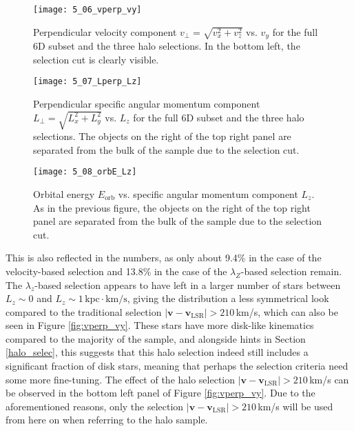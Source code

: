\documentclass[a4paper,11pt]{article}
\begin{document}
\begin{figure}[H]
 \begin{minipage}[t]{\textwidth}
  \centering
  \texttt{[image: 5\_06\_vperp\_vy]}
  \caption[$v_\perp$ vs. $v_y$ for 6D subset and three halo selections]{Perpendicular velocity component $v_\perp=\sqrt{v_x^2+v_z^2}$ vs. $v_y$ for the full 6D subset and the three halo selections. In the bottom left, the selection cut is clearly visible.}
  \label{fig:vperp_vy}
 \end{minipage}\vspace{0.5cm}
 \begin{minipage}[t]{\textwidth}
  \centering
  \texttt{[image: 5\_07\_Lperp\_Lz]}
  \caption[$L_\perp$ vs. $L_z$ for 6D subset and three halo selections]{Perpendicular specific angular momentum component $L_\perp=\sqrt{L_x^2+L_y^2}$ vs. $L_z$ for the full 6D subset and the three halo selections. The objects on the right of the top right panel are separated from the bulk of the sample due to the selection cut.}
  \label{fig:Lperp_Lz}
 \end{minipage}
\end{figure}
%
\begin{figure}
 \centering
 \texttt{[image: 5\_08\_orbE\_Lz]}
 \caption[$E_\mathrm{orb}$ vs. $L_z$ for 6D subset and three halo selections]{Orbital energy $E_\mathrm{orb}$ vs. specific angular momentum component $L_z$. As in the previous figure, the objects on the right of the top right panel are separated from the bulk of the sample due to the selection cut.}
 \label{fig:orbE_Lz}
\end{figure}
%
\noindent
This is also reflected in the numbers, as only about 9.4\% in the case of the velocity-based selection and 13.8\% in the case of the $\lambda_Z$-based selection remain. The $\lambda_z$-based selection appears to have left in a larger number of stars between $L_z\sim0$ and $L_z\sim1\,\mathrm{kpc}{\cdot}\mathrm{km/s}$, giving the distribution a less symmetrical look compared to the traditional selection $|\bm{v}-\bm{v}_\mathrm{LSR}|>210$\,km/s, which can also be seen in Figure \ref{fig:vperp_vy}. These stars have more disk-like kinematics compared to the majority of the sample, and alongside hints in Section \ref{halo_selec}, this suggests that this halo selection indeed still includes a significant fraction of disk stars, meaning that perhaps the selection criteria need some more fine-tuning. The effect of the halo selection $|\bm{v}-\bm{v}_\mathrm{LSR}|>210$\,km/s can be observed in the bottom left panel of Figure \ref{fig:vperp_vy}. Due to the aforementioned reasons, only the selection $|\bm{v}-\bm{v}_\mathrm{LSR}|>210$\,km/s will be used from here on when referring to the halo sample.\\ \\
\end{document}
